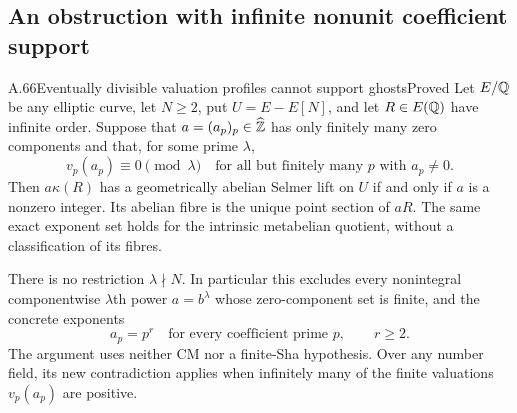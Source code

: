 \subsection{An obstruction with infinite nonunit coefficient support}

\begin{statement}{A.66}{Eventually divisible valuation profiles cannot support ghosts}{Proved}
Let $E/\mathbb Q$ be any elliptic curve, let $N\ge2$, put
$U=E-E[N]$, and let $R\in E(\mathbb Q)$ have infinite order.
Suppose that $a=(a_p)_p\in\widehat{\mathbb Z}$ has only
finitely many zero components and that, for some
prime $\lambda$,
\[
 v_p(a_p)\equiv0\pmod\lambda
       \quad\text{for all but finitely many }p
       \text{ with }a_p\ne0.
 \tag{A66.1}
\]
Then $a\kappa(R)$ has a geometrically abelian Selmer
lift on $U$ if and only if $a$ is a nonzero integer.
Its abelian fibre is the unique point section of $aR$.
The same exact exponent set holds for the intrinsic
metabelian quotient, without a classification of
its fibres.

There is no restriction $\lambda\nmid N$.
In particular this excludes every nonintegral
componentwise $\lambda$th power $a=b^\lambda$
whose zero-component set is finite, and the
concrete exponents
\[
 a_p=p^r\quad\text{for every coefficient prime }p,
                   \qquad r\ge2.
 \tag{A66.2}
\]
The argument uses neither CM nor a finite-Sha
hypothesis. Over any number field, its new
contradiction applies when infinitely many of
the finite valuations $v_p(a_p)$ are positive.
\end{statement}
